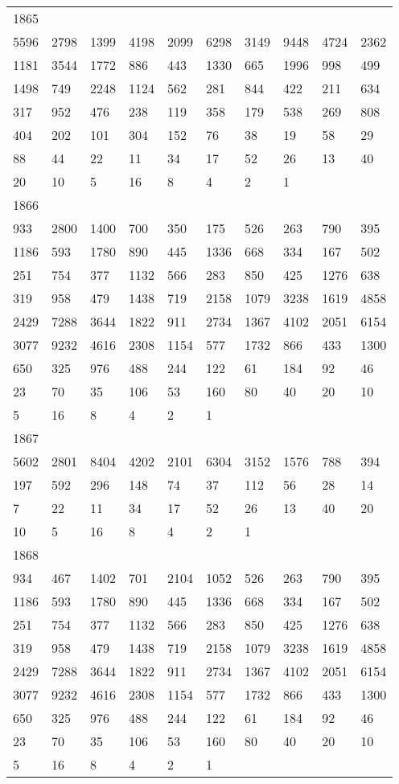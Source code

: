 \begin{longtable}{*{10}{l}}
1865&&&&&&&&&\\
5596& 2798& 1399& 4198& 2099& 6298& 3149& 9448& 4724& 2362\\
1181& 3544& 1772& 886& 443& 1330& 665& 1996& 998& 499\\
1498& 749& 2248& 1124& 562& 281& 844& 422& 211& 634\\
317& 952& 476& 238& 119& 358& 179& 538& 269& 808\\
404& 202& 101& 304& 152& 76& 38& 19& 58& 29\\
88& 44& 22& 11& 34& 17& 52& 26& 13& 40\\
20& 10& 5& 16& 8& 4& 2& 1& \\

1866&&&&&&&&&\\
933& 2800& 1400& 700& 350& 175& 526& 263& 790& 395\\
1186& 593& 1780& 890& 445& 1336& 668& 334& 167& 502\\
251& 754& 377& 1132& 566& 283& 850& 425& 1276& 638\\
319& 958& 479& 1438& 719& 2158& 1079& 3238& 1619& 4858\\
2429& 7288& 3644& 1822& 911& 2734& 1367& 4102& 2051& 6154\\
3077& 9232& 4616& 2308& 1154& 577& 1732& 866& 433& 1300\\
650& 325& 976& 488& 244& 122& 61& 184& 92& 46\\
23& 70& 35& 106& 53& 160& 80& 40& 20& 10\\
5& 16& 8& 4& 2& 1& \\

1867&&&&&&&&&\\
5602& 2801& 8404& 4202& 2101& 6304& 3152& 1576& 788& 394\\
197& 592& 296& 148& 74& 37& 112& 56& 28& 14\\
7& 22& 11& 34& 17& 52& 26& 13& 40& 20\\
10& 5& 16& 8& 4& 2& 1& \\

1868&&&&&&&&&\\
934& 467& 1402& 701& 2104& 1052& 526& 263& 790& 395\\
1186& 593& 1780& 890& 445& 1336& 668& 334& 167& 502\\
251& 754& 377& 1132& 566& 283& 850& 425& 1276& 638\\
319& 958& 479& 1438& 719& 2158& 1079& 3238& 1619& 4858\\
2429& 7288& 3644& 1822& 911& 2734& 1367& 4102& 2051& 6154\\
3077& 9232& 4616& 2308& 1154& 577& 1732& 866& 433& 1300\\
650& 325& 976& 488& 244& 122& 61& 184& 92& 46\\
23& 70& 35& 106& 53& 160& 80& 40& 20& 10\\
5& 16& 8& 4& 2& 1& \\


\end{longtable}
